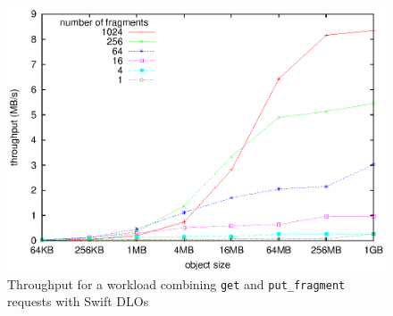 \begin{figure}[t]
\centering
\includegraphics[width=0.8\columnwidth,valign=t]{figures/fig12}
\caption{\label{ms:fig:throughputDlo}Throughput for a workload combining {\tt get} and {\tt put\_fragment} requests with Swift DLOs}
\end{figure}

